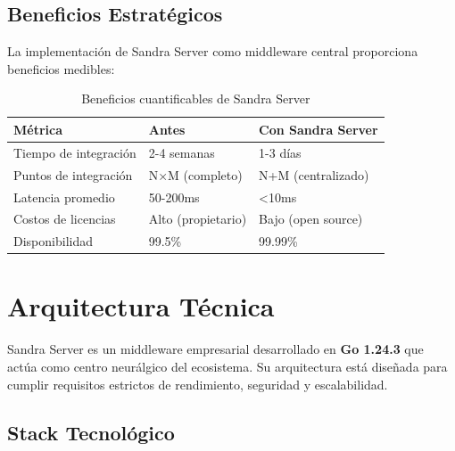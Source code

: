 \subsection{Beneficios Estratégicos}

La implementación de Sandra Server como middleware central proporciona beneficios medibles:

\begin{table}[H]
\centering
\caption{Beneficios cuantificables de Sandra Server}
\begin{tabular}{|l|p{6cm}|p{4cm}|}
\hline
\textbf{Métrica} & \textbf{Antes} & \textbf{Con Sandra Server} \\ \hline
Tiempo de integración & 2-4 semanas & 1-3 días \\ \hline
Puntos de integración & N×M (completo) & N+M (centralizado) \\ \hline
Latencia promedio & 50-200ms & <10ms \\ \hline
Costos de licencias & Alto (propietario) & Bajo (open source) \\ \hline
Disponibilidad & 99.5\% & 99.99\% \\ \hline
\end{tabular}
\end{table}

\newpage

\section{Arquitectura Técnica}

Sandra Server es un middleware empresarial desarrollado en \textbf{Go 1.24.3} que actúa como centro neurálgico del ecosistema. Su arquitectura está diseñada para cumplir requisitos estrictos de rendimiento, seguridad y escalabilidad.

\subsection{Stack Tecnológico}

